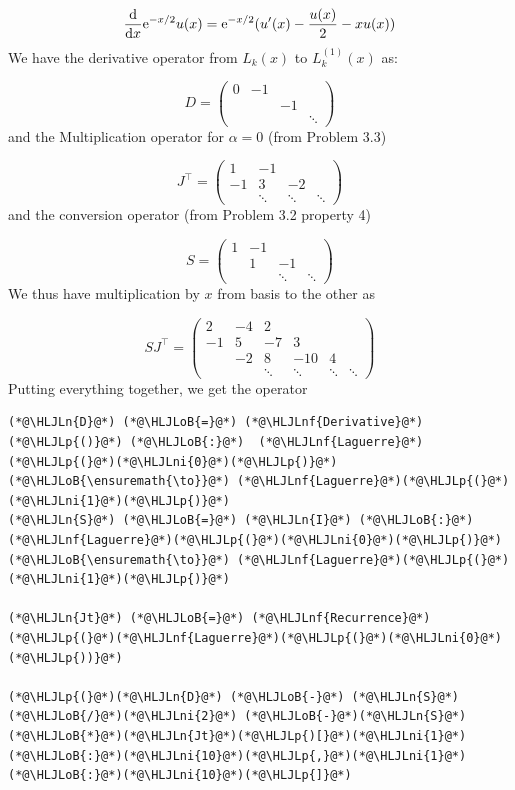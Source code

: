 \documentclass[12pt,a4paper]{article}
\newcommand{\HLJLn}[1]{#1}
\newcommand{\HLJLnf}[1]{\textcolor[RGB]{66,102,213}{#1}}
\newcommand{\HLJLni}[1]{\textcolor[RGB]{59,151,46}{#1}}
\newcommand{\HLJLoB}[1]{\textcolor[RGB]{102,102,102}{\textbf{#1}}}
\newcommand{\HLJLp}[1]{#1}
\def\D{ {\rm d} }
\def\E{ {\rm e} }
\def\dx{\D x}
\begin{document}
\[
{\D \over \dx} \E^{-x/2} u(x)  = \E^{-x/2} (u'(x) -{u(x) \over 2} - x u(x))
\]
We have the derivative operator from $L_k(x)$ to $L_k^{(1)}(x)$ as:

\[
D = \begin{pmatrix}
0 & -1 \\
  &&-1 \\
  &&&\ddots
\end{pmatrix}
\]
and the Multiplication operator for $\alpha = 0$ (from Problem 3.3)

\[
J^\top = \begin{pmatrix} 1 &-1\\
                        -1 & 3 &-2\\
                            &\ddots & \ddots & \ddots
                            \end{pmatrix}
\]
and the conversion operator (from Problem 3.2 property 4)

\[
S = \begin{pmatrix}
        1 & -1 \\ & 1 & -1 \\&&\ddots & \ddots
\end{pmatrix}        
\]
We thus have multiplication by $x$ from basis to the other as

\[
S J^\top = \begin{pmatrix}
2 & -4 & 2 \\
-1 & 5 & -7 & 3 \\
& -2 & 8 & -10 & 4\\
&&\ddots&\ddots&\ddots&\ddots
\end{pmatrix}
\]
Putting everything together, we get the operator


\begin{lstlisting}
(*@\HLJLn{D}@*) (*@\HLJLoB{=}@*) (*@\HLJLnf{Derivative}@*)(*@\HLJLp{()}@*) (*@\HLJLoB{:}@*)  (*@\HLJLnf{Laguerre}@*)(*@\HLJLp{(}@*)(*@\HLJLni{0}@*)(*@\HLJLp{)}@*) (*@\HLJLoB{\ensuremath{\to}}@*) (*@\HLJLnf{Laguerre}@*)(*@\HLJLp{(}@*)(*@\HLJLni{1}@*)(*@\HLJLp{)}@*)
(*@\HLJLn{S}@*) (*@\HLJLoB{=}@*) (*@\HLJLn{I}@*) (*@\HLJLoB{:}@*) (*@\HLJLnf{Laguerre}@*)(*@\HLJLp{(}@*)(*@\HLJLni{0}@*)(*@\HLJLp{)}@*) (*@\HLJLoB{\ensuremath{\to}}@*) (*@\HLJLnf{Laguerre}@*)(*@\HLJLp{(}@*)(*@\HLJLni{1}@*)(*@\HLJLp{)}@*)

(*@\HLJLn{Jt}@*) (*@\HLJLoB{=}@*) (*@\HLJLnf{Recurrence}@*)(*@\HLJLp{(}@*)(*@\HLJLnf{Laguerre}@*)(*@\HLJLp{(}@*)(*@\HLJLni{0}@*)(*@\HLJLp{))}@*)

(*@\HLJLp{(}@*)(*@\HLJLn{D}@*) (*@\HLJLoB{-}@*) (*@\HLJLn{S}@*)(*@\HLJLoB{/}@*)(*@\HLJLni{2}@*) (*@\HLJLoB{-}@*)(*@\HLJLn{S}@*)(*@\HLJLoB{*}@*)(*@\HLJLn{Jt}@*)(*@\HLJLp{)[}@*)(*@\HLJLni{1}@*)(*@\HLJLoB{:}@*)(*@\HLJLni{10}@*)(*@\HLJLp{,}@*)(*@\HLJLni{1}@*)(*@\HLJLoB{:}@*)(*@\HLJLni{10}@*)(*@\HLJLp{]}@*)
\end{lstlisting}
\end{document}
